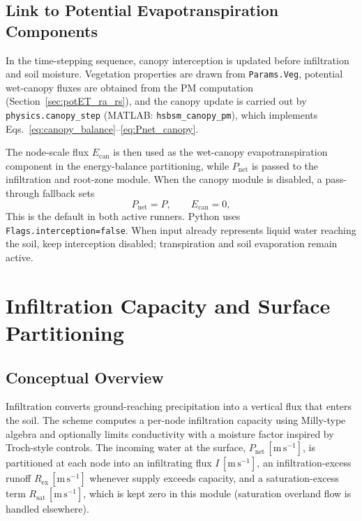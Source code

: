 \documentclass[12pt]{article}
\begin{document}
\subsection{Link to Potential Evapotranspiration Components}

In the time-stepping sequence, canopy interception is updated before infiltration and soil moisture.
Vegetation properties are drawn from \texttt{Params.Veg}, potential wet-canopy fluxes are obtained from the PM computation (Section~\ref{sec:potET_ra_rs}), and the canopy update is carried out by \texttt{physics.canopy\_step} (MATLAB: \texttt{hsbsm\_canopy\_pm}), which implements Eqs.~\eqref{eq:canopy_balance}--\eqref{eq:Pnet_canopy}.

The node-scale flux \(E_{\mathrm{can}}\) is then used as the wet-canopy evapotranspiration component in the energy-balance partitioning, while \(P_{\mathrm{net}}\) is passed to the infiltration and root-zone module.
When the canopy module is disabled, a pass-through fallback sets
\[
P_{\mathrm{net}} = P, \qquad E_{\mathrm{can}} = 0,
\]
This is the default in both active runners. Python uses \texttt{Flags.interception=false}. When input already represents liquid water reaching the soil, keep interception disabled; transpiration and soil evaporation remain active.




\section{Infiltration Capacity and Surface Partitioning}
\label{sec:infiltration}

\subsection{Conceptual Overview}
Infiltration converts ground-reaching precipitation into a vertical flux that enters the soil. The scheme computes a per-node infiltration capacity using Milly-type algebra and optionally limits conductivity with a moisture factor inspired by Troch-style controls. The incoming water at the surface, \(P_{\mathrm{net}}\,[\mathrm{m\,s^{-1}}]\), is partitioned at each node into an infiltrating flux \(I\,[\mathrm{m\,s^{-1}}]\), an infiltration-excess runoff \(R_{\mathrm{ex}}\,[\mathrm{m\,s^{-1}}]\) whenever supply exceeds capacity, and a saturation-excess term \(R_{\mathrm{sat}}\,[\mathrm{m\,s^{-1}}]\), which is kept zero in this module (saturation overland flow is handled elsewhere).
\end{document}

